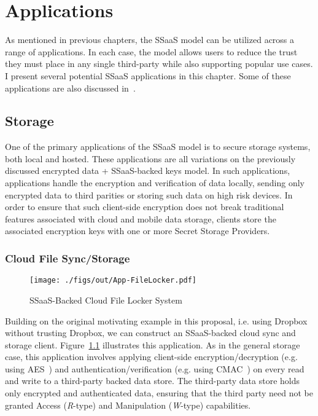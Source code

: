 \chapter{Applications}
\label{chap:apps}

As mentioned in previous chapters, the SSaaS model can be utilized
across a range of applications. In each case, the model allows users
to reduce the trust they must place in any single third-party while
also supporting popular use cases. I present several potential SSaaS
applications in this chapter. Some of these applications are also
discussed in~\cite{custos-trios}.

\section{Storage}

One of the primary applications of the SSaaS model is to secure
storage systems, both local and hosted. These applications are all
variations on the previously discussed encrypted data + SSaaS-backed
keys model. In such applications, applications handle the encryption
and verification of data locally, sending only encrypted data to third
parities or storing such data on high risk devices. In order to ensure
that such client-side encryption does not break traditional features
associated with cloud and mobile data storage, clients store the
associated encryption keys with one or more Secret Storage Providers.

\subsection{Cloud File Sync/Storage}

\begin{figure}[t]
  \centering
  \texttt{[image: ./figs/out/App-FileLocker.pdf]}
  \caption{SSaaS-Backed Cloud File Locker System}
  \label{fig:apps-filestore}
\end{figure}

Building on the original motivating example in this proposal,
i.e. using Dropbox without trusting Dropbox, we can construct an
SSaaS-backed cloud sync and storage
client. Figure~\ref{fig:apps-filestore} illustrates this
application. As in the general storage case, this application involves
applying client-side encryption/decryption (e.g. using
AES~\cite{nist2001}) and authentication/verification (e.g. using
CMAC~\cite{dworkin2005}) on every read and write to a third-party
backed data store. The third-party data store holds only encrypted and
authenticated data, ensuring that the third party need not be granted
Access (\emph{R}-type) and Manipulation (\emph{W}-type) capabilities.

